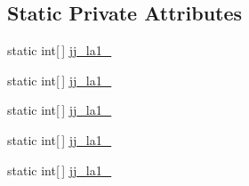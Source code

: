 \subsection*{Static Private Attributes}
\begin{DoxyCompactItemize}
\item 
static int\mbox{[}$\,$\mbox{]} \hyperlink{classorg_1_1coode_1_1owlapi_1_1functionalparser_1_1_o_w_l_functional_syntax_parser_acff903c4abc46d95e106ef4a6e1ae618}{jj\-\_\-la1\-\_}
\item 
static int\mbox{[}$\,$\mbox{]} \hyperlink{classorg_1_1coode_1_1owlapi_1_1functionalparser_1_1_o_w_l_functional_syntax_parser_a7f699b9c06ec8ab61226d4caae2c46d6}{jj\-\_\-la1\-\_}
\item 
static int\mbox{[}$\,$\mbox{]} \hyperlink{classorg_1_1coode_1_1owlapi_1_1functionalparser_1_1_o_w_l_functional_syntax_parser_a0cbf957c2c82279ae228f3418c45f4b6}{jj\-\_\-la1\-\_}
\item 
static int\mbox{[}$\,$\mbox{]} \hyperlink{classorg_1_1coode_1_1owlapi_1_1functionalparser_1_1_o_w_l_functional_syntax_parser_a8825c66018294824634ae2b6f8496d2f}{jj\-\_\-la1\-\_}
\item 
static int\mbox{[}$\,$\mbox{]} \hyperlink{classorg_1_1coode_1_1owlapi_1_1functionalparser_1_1_o_w_l_functional_syntax_parser_ad0b840d5f4ebfdcf175fdd74e2ea9405}{jj\-\_\-la1\-\_}
\end{DoxyCompactItemize}


